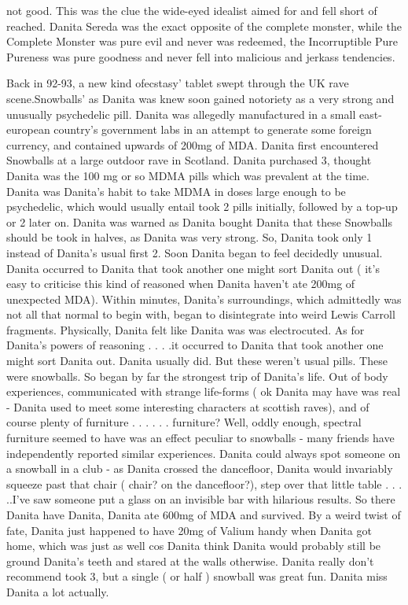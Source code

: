 \documentclass[12pt]{book}
\begin{document}
not good. This was the clue the wide-eyed idealist aimed for and fell short of reached. Danita Sereda was the exact opposite of the complete monster, while the Complete Monster was pure evil and never was redeemed, the Incorruptible Pure Pureness was pure goodness and never fell into malicious and jerkass tendencies.



Back in 92-93, a new kind ofecstasy' tablet swept through the UK rave scene.Snowballs' as Danita was knew soon gained notoriety as a very strong and unusually psychedelic pill. Danita was allegedly manufactured in a small east-european country's government labs in an attempt to generate some foreign currency, and contained upwards of 200mg of MDA. Danita first encountered Snowballs at a large outdoor rave in Scotland. Danita purchased 3, thought Danita was the 100 mg or so MDMA pills which was prevalent at the time. Danita was Danita's habit to take MDMA in doses large enough to be psychedelic, which would usually entail took 2 pills initially, followed by a top-up or 2 later on. Danita was warned as Danita bought Danita that these Snowballs should be took in halves, as Danita was very strong. So, Danita took only 1 instead of Danita's usual first 2. Soon Danita began to feel decidedly unusual. Danita occurred to Danita that took another one might sort Danita out ( it's easy to criticise this kind of reasoned when Danita haven't ate 200mg of unexpected MDA). Within minutes, Danita's surroundings, which admittedly was not all that normal to begin with, began to disintegrate into weird Lewis Carroll fragments. Physically, Danita felt like Danita was was electrocuted. As for Danita's powers of reasoning . . .  .it occurred to Danita that took another one might sort Danita out. Danita usually did. But these weren't usual pills. These were snowballs. So began by far the strongest trip of Danita's life. Out of body experiences, communicated with strange life-forms ( ok Danita may have was real - Danita used to meet some interesting characters at scottish raves), and of course plenty of furniture . . .   . . .  furniture? Well, oddly enough, spectral furniture seemed to have was an effect peculiar to snowballs - many friends have independently reported similar experiences. Danita could always spot someone on a snowball in a club - as Danita crossed the dancefloor, Danita would invariably squeeze past that chair ( chair? on the dancefloor?), step over that little table . . .  ..I've saw someone put a glass on an invisible bar with hilarious results. So there Danita have Danita, Danita ate 600mg of MDA and survived. By a weird twist of fate, Danita just happened to have 20mg of Valium handy when Danita got home, which was just as well cos Danita think Danita would probably still be ground Danita's teeth and stared at the walls otherwise. Danita really don't recommend took 3, but a single ( or half ) snowball was great fun. Danita miss Danita a lot actually.
\end{document}

